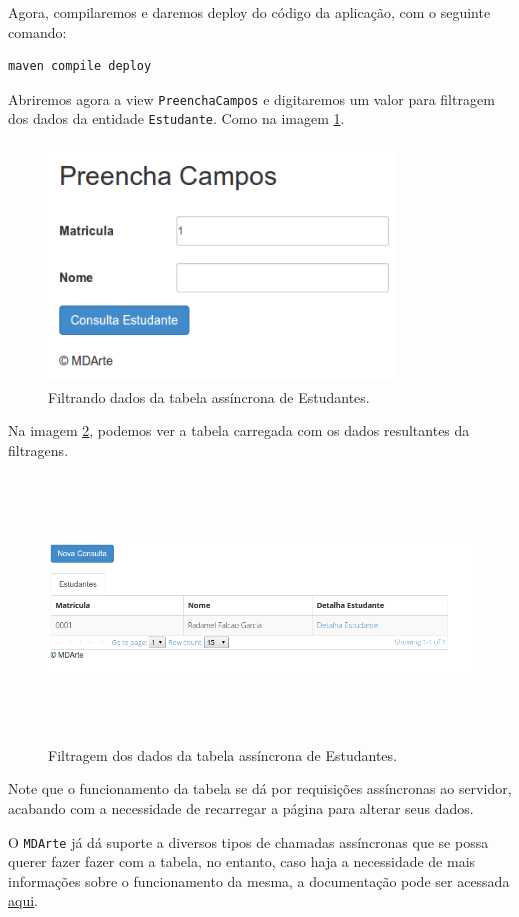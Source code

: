 Agora, compilaremos e daremos deploy do código da aplicação, com o seguinte
comando:

\begin{lstlisting}[language=bash, frame=single, breaklines=true]
maven compile deploy
\end{lstlisting}

Abriremos agora a view \texttt{PreenchaCampos} e digitaremos um valor para
filtragem dos dados da entidade \texttt{Estudante}. Como na imagem
\ref{preencha_campos_tabela_async_simples}.

\begin{figure}[H]
	\centering
	\includegraphics[width=260pt,height=180pt]{files/imgs/tutorial-mdarte-0031.png}
	\caption{Filtrando dados da tabela assíncrona de Estudantes.}
	\label{preencha_campos_tabela_async_simples}
\end{figure}

Na imagem \ref{resultado_consulta_tabela_async_simples}, podemos ver a tabela
carregada com os dados resultantes da filtragens.

\begin{figure}[H]
	\centering
	\includegraphics[width=460pt,height=200pt]{files/imgs/tutorial-mdarte-0032.png}
	\caption{Filtragem dos dados da tabela assíncrona de Estudantes.}
	\label{resultado_consulta_tabela_async_simples}
\end{figure}

Note que o funcionamento da tabela se dá por requisições assíncronas
ao servidor, acabando com a necessidade de recarregar a página para alterar seus
dados. 

O \texttt{MDArte} já dá suporte a diversos tipos de chamadas assíncronas que se
possa querer fazer fazer com a tabela, no entanto, caso haja a necessidade de
mais informações sobre o funcionamento da mesma, a documentação pode ser
acessada \href{http://www.jtable.org/Home/Documents}{aqui}.